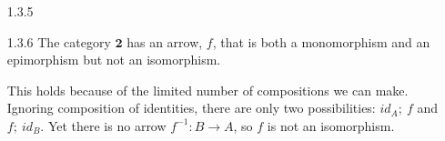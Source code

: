 \documentclass{article}
\begin{document}
\begin{enumerate}
\item[]
\item[1.3.5]

\item[]
\item[1.3.6] The category $\textbf{2}$ has an arrow, $f$, that is both a monomorphism and an epimorphism but not an isomorphism. 
  \begin{center}
  \end{center}
  This holds because of the limited number of compositions we can make. 
  Ignoring composition of identities, there are only two possibilities: $id_A;\ f$ and $f;\ id_B$. 
  Yet there is no arrow $f^{-1}: B \rightarrow A$, so $f$ is not an isomorphism.
\end{enumerate}
\end{document}
